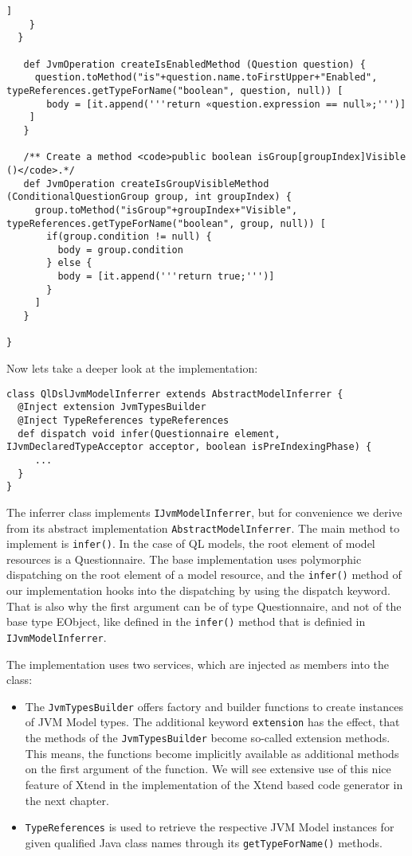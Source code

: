 \begin{lstlisting}[language=Xtend]
      ]
    }
  }

   def JvmOperation createIsEnabledMethod (Question question) {
     question.toMethod("is"+question.name.toFirstUpper+"Enabled", typeReferences.getTypeForName("boolean", question, null)) [
       body = [it.append('''return «question.expression == null»;''')]
    ]
   }

   /** Create a method <code>public boolean isGroup[groupIndex]Visible ()</code>.*/
   def JvmOperation createIsGroupVisibleMethod (ConditionalQuestionGroup group, int groupIndex) {
     group.toMethod("isGroup"+groupIndex+"Visible", typeReferences.getTypeForName("boolean", group, null)) [
       if(group.condition != null) {
         body = group.condition
       } else {
         body = [it.append('''return true;''')]
       }
     ]
   }

}
\end{lstlisting}

Now lets take a deeper look at the implementation:

\begin{lstlisting}[language=Xtend]
class QlDslJvmModelInferrer extends AbstractModelInferrer {
  @Inject extension JvmTypesBuilder
  @Inject TypeReferences typeReferences
  def dispatch void infer(Questionnaire element, IJvmDeclaredTypeAcceptor acceptor, boolean isPreIndexingPhase) {
     ...
  }
}
\end{lstlisting}

The inferrer class implements \texttt{IJvmModelInferrer}, but for convenience we derive
from its abstract implementation \texttt{AbstractModelInferrer}. The main method to
implement is \texttt{infer()}. In the case of QL models, the root element
of model resources is a Questionnaire. The base implementation uses polymorphic dispatching on
the root element of a model resource, and the \texttt{infer()} method of our
implementation hooks into the dispatching by using the dispatch keyword. That is
also why the first argument can be of type Questionnaire, and not of the base
type EObject, like defined in the \texttt{infer()} method that is definied in
\texttt{IJvmModelInferrer}.

The implementation uses two services, which are injected as members into the
class:
\begin{itemize}
\item The \texttt{JvmTypesBuilder} offers factory and builder functions to create
instances of JVM Model types. The additional keyword \texttt{extension} has the effect,
that the methods of the \texttt{JvmTypesBuilder} become so-called extension methods.
This means, the functions become implicitly available as additional
methods on the first argument of the function. We will see extensive use of this
nice feature of Xtend in the implementation of the Xtend based code generator in
the next chapter.
\item \texttt{TypeReferences} is used to retrieve the respective JVM Model instances for
given qualified Java class names through its \texttt{getTypeForName()} methods. 
\end{itemize}


